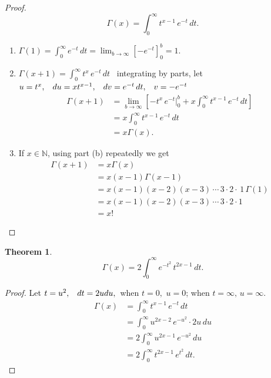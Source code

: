 \documentclass[12pt,a4paper]{report}
\theoremstyle{definition}
\newtheorem{thm}{Theorem}[section]
\theoremstyle{plain}
\begin{document}
\begin{proof}
$$\Gamma(x) = \int_0^{\infty} t^{x-1}\, e^{-t}\, dt.$$
\begin{enumerate}
\item[(a).] $\Gamma(1) = \displaystyle{\int^{\infty}_0}e^{-t}\, dt = \lim_{b\rightarrow \infty}\left[-e^{-t}\right]_0^b = 1.$

\item[(b).] $\Gamma(x + 1) = \displaystyle{\int_0^{\infty} t^x\, e^{-t}\, dt}$\,\,\,
integrating by parts, let
$u = t^x, \hspace{0.3cm} du = xt^{x-1}, \hspace{0.3cm} dv = e^{-t}\, dt, \hspace{0.3cm} v = -e^{-t}$
\begin{align*}
\Gamma(x + 1) & = \lim_{b\rightarrow \infty}\left[-t^x\, e^{-t}\Big|_0^b + x\int_0^{\infty} t^{x - 1}\, e^{-t}\, dt\right]\\
& = x\int_0^{\infty} t^{x - 1}\, e^{-t}\, dt\\
& = x\Gamma(x).
\end{align*}

\item[(c).] If $x\in \mathbb{N}$, using part (b) repeatedly we get 
\begin{align*}
\Gamma(x + 1) & = x\Gamma(x)\\
              & = x(x-1)\Gamma(x-1)\\
              & = x(x-1)(x-2)(x-3)\, \cdots\, 3\cdot 2\cdot\, 1\, \Gamma(1)\\
              & = x(x-1)(x-2)(x-3)\, \cdots\, 3\cdot 2\cdot 1\\
              &  = x!
\end{align*}
\end{enumerate}
\end{proof}




\begin{thm}
$$\Gamma(x) = 2\int_0^{\infty} e^{-t^2}\, t^{2x - 1}\, dt.$$
\end{thm}

\begin{proof}
Let $t = u^2, \hspace{0.3cm} dt = 2udu, \,$ when $t = 0, \,\, u = 0$; when $t = \infty, \, u = \infty$.
\begin{align*}
\Gamma(x) & = \int_0^{\infty}t^{x-1}\, e^{-t}\, dt\\
          & = \int_0^{\infty} u^{2x-2}\, e^{-u^2}\cdot 2u\, du\\
          & = 2\int_0^{\infty}u^{2x-1}\, e^{-u^2}\, du\\
          & = 2\int_0^{\infty} t^{2x - 1}\, e^{t^2}\, dt.
\end{align*}
\end{proof}
\end{document}
